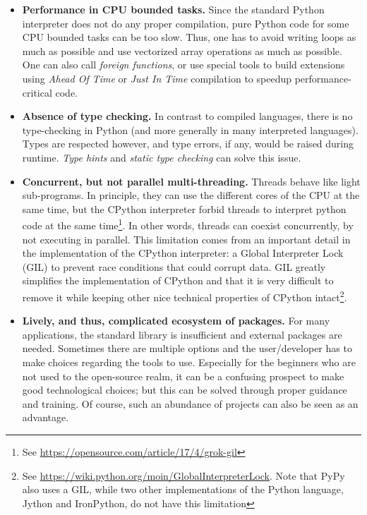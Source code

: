 \begin{itemize}

\item \textbf{Performance in CPU bounded tasks.} Since the standard Python
	interpreter does not do any proper compilation, pure Python code for
	some CPU bounded tasks can be too slow. Thus, one has to avoid writing
	loops as much as possible and use vectorized array operations as much
	as possible. One can also call \emph{foreign functions}, or use special
	tools to build extensions using \emph{Ahead Of Time} or \emph{Just In
	Time} compilation to speedup performance-critical code.

\item \textbf{Absence of type checking.} In contrast to compiled languages,
	there is no type-checking in Python (and more generally in many
	interpreted languages). Types are respected however, and type errors,
	if any, would be raised during runtime.
	\emph{Type hints} and \emph{static type checking} can solve this issue.

\item \textbf{Concurrent, but not parallel multi-threading.} Threads behave
	like light sub-programs. In principle, they can use the different cores
	of the CPU at the same time, but the CPython interpreter forbid threads
	to interpret python code at the same time\footnote{See
	\url{https://opensource.com/article/17/4/grok-gil}
	}. In other words, threads can coexist concurrently, by not executing in
	parallel.
%
This limitation comes from an important detail in the implementation of the
CPython interpreter: a Global Interpreter Lock (GIL) to prevent race conditions
that could corrupt data.
%
GIL greatly simplifies the implementation of CPython and that
it is very difficult to remove it while keeping other nice technical properties
of CPython intact\footnote{See
\url{https://wiki.python.org/moin/GlobalInterpreterLock}. Note that PyPy
also uses a GIL, while two other implementations of the Python language, Jython
and IronPython, do not have this limitation}.

\item \textbf{Lively, and thus, complicated ecosystem of packages.} For many
	applications, the standard library is insufficient and external
	packages are needed. Sometimes there are multiple options and the
	user/developer has to make choices regarding the tools to use.
	Especially for the beginners who are not used to the open-source realm,
	it can be a confusing prospect to make good technological choices; but
	this can be solved through proper guidance and training.
	Of course, such an abundance of projects can also be seen as an advantage.

\end{itemize}

